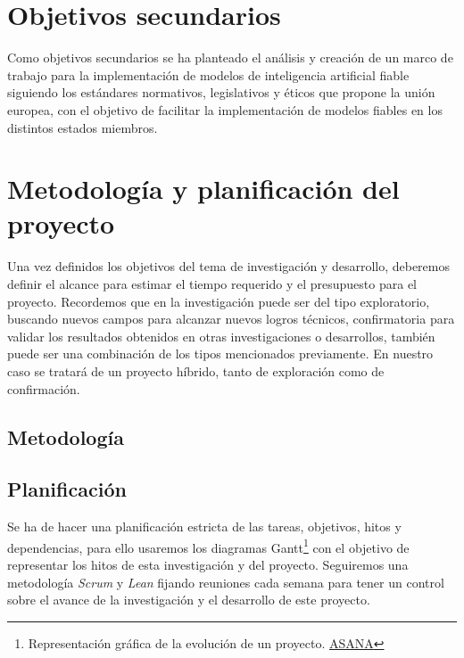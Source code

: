 \section{Objetivos secundarios}
Como objetivos secundarios se ha planteado el análisis y creación de un marco de trabajo para la implementación de modelos de inteligencia artificial fiable siguiendo los estándares normativos, legislativos y éticos que propone la unión europea, con el objetivo de facilitar la implementación de modelos fiables en los distintos estados miembros.

\section{Metodología y planificación del proyecto}

Una vez definidos los objetivos del tema de investigación y desarrollo, deberemos definir el alcance para estimar el tiempo requerido y el presupuesto para el proyecto.
Recordemos que en la investigación puede ser del tipo exploratorio, buscando nuevos campos para alcanzar nuevos logros técnicos, confirmatoria para validar los resultados obtenidos en otras investigaciones o desarrollos, también puede ser una combinación de los tipos mencionados previamente.
En nuestro caso se tratará de un proyecto híbrido, tanto de exploración como de confirmación.


\subsection{Metodología}


\subsection{Planificación}

Se ha de hacer una planificación estricta de las tareas, objetivos, hitos y dependencias, para ello usaremos los diagramas Gantt\footnote{Representación gráfica de la evolución de un proyecto. \href{https://asana.com/es/resources/gantt-chart-basics}{ASANA}} con el objetivo de representar los hitos de esta investigación y del proyecto.
Seguiremos una metodología \textit{Scrum} y \textit{Lean} fijando reuniones cada semana para tener un control sobre el avance de la investigación y el desarrollo de este proyecto.


